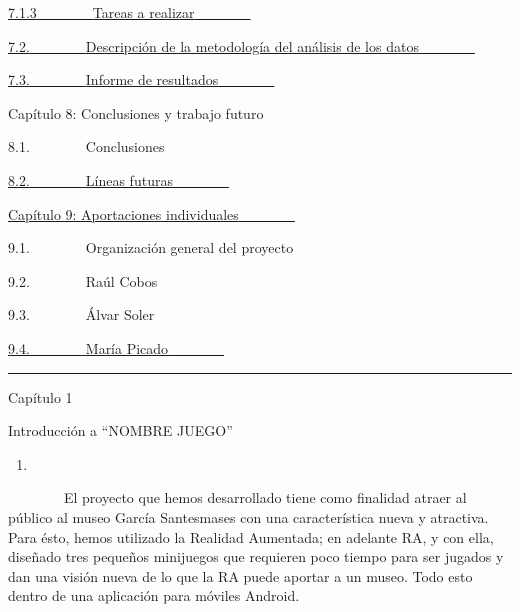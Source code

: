 \hyperref[h.nmf14n]{7.1.3}\hyperref[h.nmf14n]{~~~~~~~~}\hyperref[h.nmf14n]{Tareas
a realizar}\hyperref[h.nmf14n]{~~~~~~~~}

\hyperref[h.37m2jsg]{7.2.}\hyperref[h.37m2jsg]{~~~~~~~~}\hyperref[h.37m2jsg]{Descripción
de la metodología del análisis de los
datos}\hyperref[h.37m2jsg]{~~~~~~~~}

\hyperref[h.1mrcu09]{7.3.}\hyperref[h.1mrcu09]{~~~~~~~~}\hyperref[h.1mrcu09]{Informe
de resultados}\hyperref[h.1mrcu09]{~~~~~~~~}

Capítulo 8: Conclusiones y trabajo futuro~~~~~~~~

8.1.~~~~~~~~Conclusiones~~~~~~~~

\hyperref[h.111kx3o]{8.2.}\hyperref[h.111kx3o]{~~~~~~~~}\hyperref[h.111kx3o]{Líneas
futuras}\hyperref[h.111kx3o]{~~~~~~~~}

\hyperref[h.3l18frh]{Capítulo 9: Aportaciones
individuales}\hyperref[h.3l18frh]{~~~~~~~~}

9.1.~~~~~~~~Organización general del proyecto~~~~~~~~

9.2.~~~~~~~~Raúl Cobos~~~~~~~~

9.3.~~~~~~~~Álvar Soler~~~~~~~~

\hyperref[h.1egqt2p]{9.4.}\hyperref[h.1egqt2p]{~~~~~~~~}\hyperref[h.1egqt2p]{María
Picado}\hyperref[h.1egqt2p]{~~~~~~~~}

\hyperref[h.1egqt2p]{}

\begin{center}\rule{3in}{0.4pt}\end{center}

\hyperref[h.1egqt2p]{}

\hyperref[h.1egqt2p]{}

Capítulo 1

Introducción a ``NOMBRE JUEGO''

\begin{enumerate}
\def\labelenumi{\arabic{enumi}.}
\item
\end{enumerate}

~~~~~~~~El proyecto que hemos desarrollado tiene como finalidad atraer
al público al museo García Santesmases con una característica nueva y
atractiva. Para ésto, hemos utilizado la Realidad Aumentada; en adelante
RA, y con ella, diseñado tres pequeños minijuegos que requieren poco
tiempo para ser jugados y dan una visión nueva de lo que la RA puede
aportar a un museo. Todo esto dentro de una aplicación para móviles
Android.

